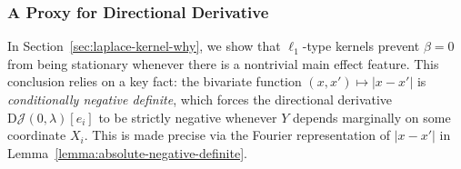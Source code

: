 \documentclass[sn-mathphys-num]{sn-jnl}%
\numberwithin{equation}{section}
\theoremstyle{thmstyleone}%
\theoremstyle{thmstyletwo}%
\theoremstyle{thmstylethree}%
\begin{document}
%
%
%

\subsubsection{A Proxy for Directional Derivative} 
\label{sec:proxy-for-directional-derivative}
In Section~\ref{sec:laplace-kernel-why}, we show that $\ell_1$-type kernels prevent $\beta = 0$ from being stationary whenever there is a nontrivial main effect feature. This conclusion relies on a key fact: the bivariate function $(x, x') \mapsto |x - x'|$ is \emph{conditionally negative definite}, which forces the directional derivative $\mathrm{D}\mathcal{J}(0, \lambda)[e_i]$ to be strictly negative whenever $Y$ depends marginally on some coordinate $X_i$. This is made precise via the Fourier representation of $|x - x'|$ in Lemma~\ref{lemma:absolute-negative-definite}.
\end{document}
